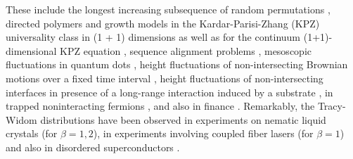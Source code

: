 \documentclass[onecolumn,superscriptaddress,
 amsmath,amssymb,
 aps,
 prd,
]{revtex4-1}
\begin{document}
These include the longest increasing subsequence of random permutations \cite{BDJ99,BR00,M06}, directed polymers and growth models \cite{DPRM} in the Kardar-Parisi-Zhang (KPZ) universality class in (1 + 1) dimensions as well as for the continuum (1+1)-dimensional KPZ equation \cite{TS10,CLR10,D10,ACQ11}, sequence alignment problems \cite{MN05}, mesoscopic fluctuations in quantum dots \cite{DOTS}, height fluctuations of non-intersecting Brownian motions over a fixed time interval \cite{FMS11,L12}, height fluctuations of non-intersecting interfaces in presence of a long-range interaction induced by a substrate \cite{NM09}, in trapped noninteracting fermions \cite{DLMS15,DLMS16,DLMS19}, and also in finance \cite{BB07}. Remarkably, the Tracy-Widom distributions have been observed in experiments on nematic liquid crystals \cite{KPZ} (for $\beta = 1, 2$), in experiments involving coupled fiber lasers \cite{FPNFD12} (for $\beta  = 1$) and also in disordered superconductors \cite{Lemarie}.
\end{document}

